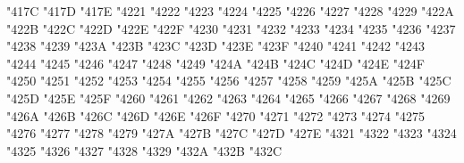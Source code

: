 {\Uchar\jis"417C %
\Uchar\jis"417D %
\Uchar\jis"417E %
\Uchar\jis"4221 %
\Uchar\jis"4222 %
\Uchar\jis"4223 %
\Uchar\jis"4224 %
\Uchar\jis"4225 %
\Uchar\jis"4226 %
\Uchar\jis"4227 %
\Uchar\jis"4228 %
\Uchar\jis"4229 %
\Uchar\jis"422A %
\Uchar\jis"422B %
\Uchar\jis"422C %
\Uchar\jis"422D %
\Uchar\jis"422E %
\Uchar\jis"422F %
\Uchar\jis"4230 %
\Uchar\jis"4231 %
\Uchar\jis"4232 %
\Uchar\jis"4233 %
\Uchar\jis"4234 %
\Uchar\jis"4235 %
\Uchar\jis"4236 %
\Uchar\jis"4237 %
\Uchar\jis"4238 %
\Uchar\jis"4239 %
\Uchar\jis"423A %
\Uchar\jis"423B %
\Uchar\jis"423C %
\Uchar\jis"423D %
\Uchar\jis"423E %
\Uchar\jis"423F %
\Uchar\jis"4240 %
\Uchar\jis"4241 %
\Uchar\jis"4242 %
\Uchar\jis"4243 %
\Uchar\jis"4244 %
\Uchar\jis"4245 %
\Uchar\jis"4246 %
\Uchar\jis"4247 %
\Uchar\jis"4248 %
\Uchar\jis"4249 %
\Uchar\jis"424A %
\Uchar\jis"424B %
\Uchar\jis"424C %
\Uchar\jis"424D %
\Uchar\jis"424E %
\Uchar\jis"424F %
\Uchar\jis"4250 %
\Uchar\jis"4251 %
\Uchar\jis"4252 %
\Uchar\jis"4253 %
\Uchar\jis"4254 %
\Uchar\jis"4255 %
\Uchar\jis"4256 %
\Uchar\jis"4257 %
\Uchar\jis"4258 %
\Uchar\jis"4259 %
\Uchar\jis"425A %
\Uchar\jis"425B %
\Uchar\jis"425C %
\Uchar\jis"425D %
\Uchar\jis"425E %
\Uchar\jis"425F %
\Uchar\jis"4260 %
\Uchar\jis"4261 %
\Uchar\jis"4262 %
\Uchar\jis"4263 %
\Uchar\jis"4264 %
\Uchar\jis"4265 %
\Uchar\jis"4266 %
\Uchar\jis"4267 %
\Uchar\jis"4268 %
\Uchar\jis"4269 %
\Uchar\jis"426A %
\Uchar\jis"426B %
\Uchar\jis"426C %
\Uchar\jis"426D %
\Uchar\jis"426E %
\Uchar\jis"426F %
\Uchar\jis"4270 %
\Uchar\jis"4271 %
\Uchar\jis"4272 %
\Uchar\jis"4273 %
\Uchar\jis"4274 %
\Uchar\jis"4275 %
\Uchar\jis"4276 %
\Uchar\jis"4277 %
\Uchar\jis"4278 %
\Uchar\jis"4279 %
\Uchar\jis"427A %
\Uchar\jis"427B %
\Uchar\jis"427C %
\Uchar\jis"427D %
\Uchar\jis"427E %
\Uchar\jis"4321 %
\Uchar\jis"4322 %
\Uchar\jis"4323 %
\Uchar\jis"4324 %
\Uchar\jis"4325 %
\Uchar\jis"4326 %
\Uchar\jis"4327 %
\Uchar\jis"4328 %
\Uchar\jis"4329 %
\Uchar\jis"432A %
\Uchar\jis"432B %
\Uchar\jis"432C %
}
